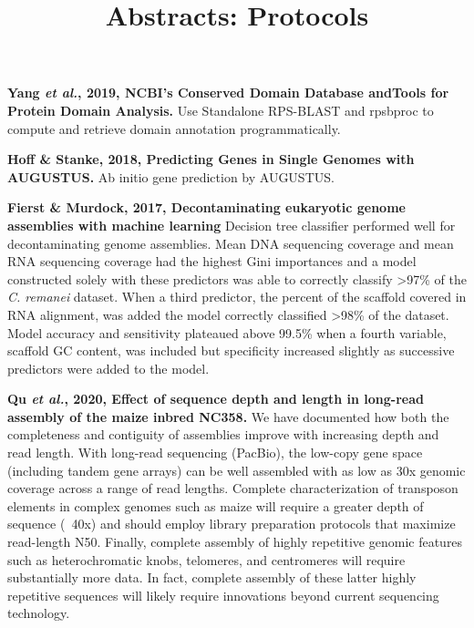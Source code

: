 \documentclass[11pt]{article}
\title{Abstracts: Protocols}
\author{}
\date{}
\begin{document}
\begin{sloppypar}
  \maketitle

  \linenumbers
\textbf{Yang \textit{et al.}, 2019, NCBI’s Conserved Domain Database andTools for Protein Domain Analysis.} \newline
Use Standalone RPS-BLAST and rpsbproc to compute and retrieve domain annotation programmatically.
\par
\textbf{Hoff & Stanke, 2018, Predicting Genes in Single Genomes with AUGUSTUS.} \newline
Ab initio gene prediction by AUGUSTUS.
\par
\textbf{Fierst & Murdock, 2017, Decontaminating eukaryotic genome assemblies with machine learning} \newline
Decision tree classifier performed well for decontaminating genome assemblies. 
Mean DNA sequencing coverage and mean RNA sequencing coverage had the highest Gini importances and a model constructed solely with these predictors was able to correctly classify >97\% of the \textit{C. remanei} dataset. 
When a third predictor, the percent of the scaffold covered in RNA alignment, was added the model correctly classified >98\% of the dataset. 
Model accuracy and sensitivity plateaued above 99.5\% when a fourth variable, scaffold GC content, was included but specificity increased slightly as successive predictors were added to the model. 
\par
\textbf{Qu \textit{et al.}, 2020, Effect of sequence depth and length in long-read assembly of the maize inbred NC358.} \newline
We have documented how both the completeness and contiguity of assemblies improve with increasing depth and read length. 
With long-read sequencing (PacBio), the low-copy gene space (including tandem gene arrays) can be well assembled with as low as 30x genomic coverage across a range of read lengths. 
Complete characterization of transposon elements in complex genomes such as maize will require a greater depth of sequence (~40x) and should employ library preparation protocols that maximize read-length N50. 
Finally, complete assembly of highly repetitive genomic features such as heterochromatic knobs, telomeres, and centromeres will require substantially more data. 
In fact, complete assembly of these latter highly repetitive sequences will likely require innovations beyond current sequencing technology.

\end{sloppypar}
\end{document}
